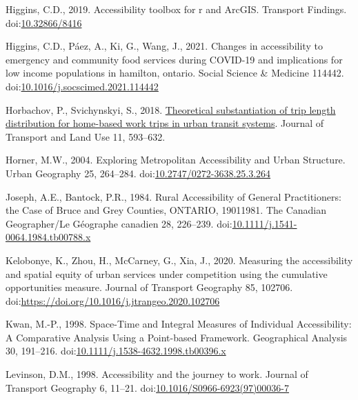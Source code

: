 \documentclass[]{elsarticle} %
\newlength{\cslhangindent}
\newlength{\cslentryspacingunit} %
\newenvironment{CSLReferences}[2] %
 {%
  \setlength{\parindent}{0pt}
  \ifodd #1
  \let\oldpar\par
  \def\par{\hangindent=\cslhangindent\oldpar}
  \fi
  \setlength{\parskip}{#2\cslentryspacingunit}
 }%
 {}
\begin{document}
\begin{CSLReferences}{1}{0}
\leavevmode{}%
Higgins, C.D., 2019. Accessibility toolbox for r and ArcGIS. Transport
Findings. doi:\href{https://doi.org/10.32866/8416}{10.32866/8416}

\leavevmode{}%
Higgins, C.D., Páez, A., Ki, G., Wang, J., 2021. Changes in
accessibility to emergency and community food services during COVID-19
and implications for low income populations in hamilton, ontario. Social
Science \& Medicine 114442.
doi:\href{https://doi.org/10.1016/j.socscimed.2021.114442}{10.1016/j.socscimed.2021.114442}

\leavevmode{}%
Horbachov, P., Svichynskyi, S., 2018.
\href{https://www.jstor.org/stable/26622420}{Theoretical substantiation
of trip length distribution for home-based work trips in urban transit
systems}. Journal of Transport and Land Use 11, 593--632.

\leavevmode{}%
Horner, M.W., 2004. Exploring {Metropolitan} {Accessibility} and {Urban}
{Structure}. Urban Geography 25, 264--284.
doi:\href{https://doi.org/10.2747/0272-3638.25.3.264}{10.2747/0272-3638.25.3.264}

\leavevmode{}%
Joseph, A.E., Bantock, P.R., 1984. Rural Accessibility of General
Practitioners: the Case of Bruce and Grey Counties, ONTARIO,
1901{\textendash}1981. The Canadian Geographer/Le Géographe canadien 28,
226--239.
doi:\href{https://doi.org/10.1111/j.1541-0064.1984.tb00788.x}{10.1111/j.1541-0064.1984.tb00788.x}

\leavevmode{}%
Kelobonye, K., Zhou, H., McCarney, G., Xia, J., 2020. Measuring the
accessibility and spatial equity of urban services under competition
using the cumulative opportunities measure. Journal of Transport
Geography 85, 102706.
doi:\url{https://doi.org/10.1016/j.jtrangeo.2020.102706}

\leavevmode{}%
Kwan, M.-P., 1998. Space-{Time} and {Integral} {Measures} of
{Individual} {Accessibility}: {A} {Comparative} {Analysis} {Using} a
{Point}-based {Framework}. Geographical Analysis 30, 191--216.
doi:\href{https://doi.org/10.1111/j.1538-4632.1998.tb00396.x}{10.1111/j.1538-4632.1998.tb00396.x}

\leavevmode{}%
Levinson, D.M., 1998. Accessibility and the journey to work. Journal of
Transport Geography 6, 11--21.
doi:\href{https://doi.org/10.1016/S0966-6923(97)00036-7}{10.1016/S0966-6923(97)00036-7}


\end{CSLReferences}
\end{document}
